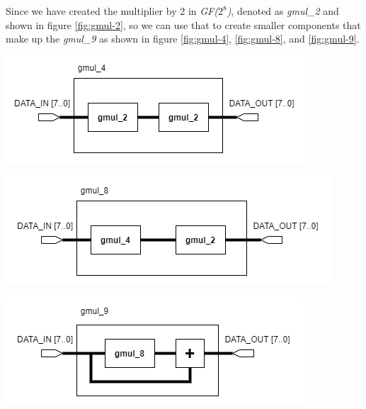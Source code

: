 \documentclass[a4paper, 10pt]{article}
\newenvironment{Figure}
    {\par\medskip\noindent\minipage{\linewidth}}
    {\endminipage\par\medskip}
\begin{document}
\begin{multicols}{2}
	Since we have created the multiplier by 2 in \textit{GF($2^{8}$)}, denoted as \textit{gmul\_2} and shown in figure \ref{fig:gmul-2}, so we can use that to create smaller components that make up the \textit{gmul\_9} as shown in figure \ref{fig:gmul-4}, \ref{fig:gmul-8}, and \ref{fig:gmul-9}.

	\noindent
            \begin{Figure}
                \centering
                \includegraphics[width=\linewidth]{InvMixColumns-gmul_4.png}
                \label{fig:gmul-4}
            \end{Figure}

	\noindent
            \begin{Figure}
                \centering
                \includegraphics[width=\linewidth]{InvMixColumns-gmul_8.png}
                \label{fig:gmul-8}
            \end{Figure}

	\noindent
            \begin{Figure}
                \centering
                \includegraphics[width=\linewidth]{InvMixColumns-gmul_9.png}
                \label{fig:gmul-9}
            \end{Figure}


\end{multicols}
\end{document}
